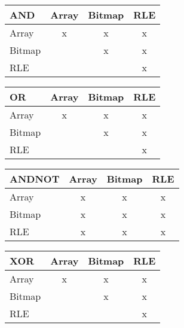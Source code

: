 \documentclass{article} %
\begin{document}

\begin{tabular}{l | c c c |}
  \textbf{AND \hphantom{NOT}} & Array & Bitmap & RLE \\
  \hline
  Array  & x & x & \cellcolor{pilosa-green} x \\
  Bitmap &   & x & \cellcolor{pilosa-green} x \\
  RLE    &   &   & \cellcolor{pilosa-green} x \\
  \hline
\end{tabular}
\hspace{5mm}
\begin{tabular}{l | c c c |}
  \textbf{OR \hphantom{ANDN}} & Array & Bitmap & RLE \\
  \hline
  Array  & x & x & \cellcolor{pilosa-green} x \\
  Bitmap &   & x & \cellcolor{pilosa-green} x \\
  RLE    &   &   & \cellcolor{pilosa-green} x \\
  \hline
\end{tabular}

\vspace{5mm}

\begin{tabular}{l | c c c |}
  \textbf{ANDNOT \hphantom{}} & Array & Bitmap & RLE \\
  \hline
  Array  & x & x & \cellcolor{pilosa-green} x \\
  Bitmap & x & x & \cellcolor{pilosa-green} x \\
  RLE    & \cellcolor{pilosa-green}x & \cellcolor{pilosa-green}x & \cellcolor{pilosa-green} x \\
  \hline
\end{tabular}
\hspace{5mm}
\begin{tabular}{l | c c c |}
  \textbf{XOR \hphantom{NDN}} & Array & Bitmap & RLE \\
  \hline
  Array  & \cellcolor{pilosa-green} x & \cellcolor{pilosa-green} x & \cellcolor{pilosa-green} x \\
  Bitmap &   & \cellcolor{pilosa-green} x & \cellcolor{pilosa-green} x \\
  RLE    &   &   & \cellcolor{pilosa-green} x \\
  \hline
\end{tabular}
 
\end{document}
